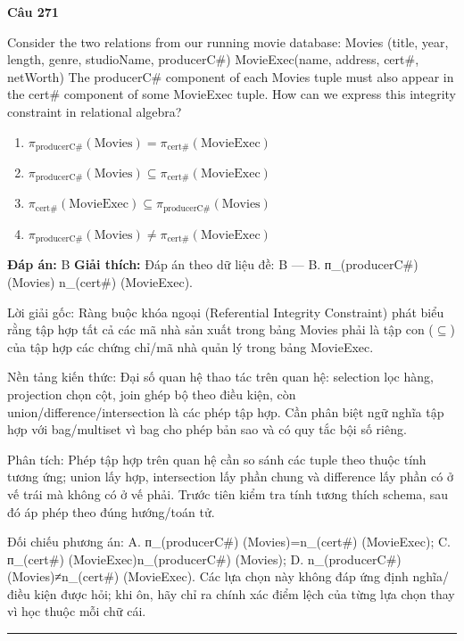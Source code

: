 \documentclass[11pt,a4paper]{article}
\newenvironment{question}[1]{%
  \par\vspace{1em}\noindent\textbf{\large Câu #1}\par\vspace{0.4em}
}{%
  \par\vspace{1em}\hrule\vspace{0.6em}
}
\newenvironment{choices}{%
  \begin{enumerate}[label=\textbf{\Alph*.},leftmargin=2.2em,itemsep=2pt,topsep=3pt]
}{%
  \end{enumerate}
}
\newcommand{\choice}{\item}
\begin{document}
\begin{question}{271}
Consider the two relations from our running movie database: Movies (title, year, length, genre, studioName, producerC#) MovieExec(name, address, cert#, netWorth) The producerC# component of each Movies tuple must also appear in the cert# component of some MovieExec tuple. How can we express this integrity constraint in relational algebra?
\begin{choices}
\choice \(\pi_{\text{producerC#}}(\text{Movies}) = \pi_{\text{cert#}}(\text{MovieExec})\)
\choice \(\pi_{\text{producerC#}}(\text{Movies}) \subseteq \pi_{\text{cert#}}(\text{MovieExec})\)
\choice \(\pi_{\text{cert#}}(\text{MovieExec}) \subseteq \pi_{\text{producerC#}}(\text{Movies})\)
\choice \(\pi_{\text{producerC#}}(\text{Movies}) \neq \pi_{\text{cert#}}(\text{MovieExec})\)
\end{choices}
\textbf{Đáp án:} B
\textbf{Giải thích:} Đáp án theo dữ liệu đề: B — B. п_(producerC#) (Movies) n_(cert#) (MovieExec).

Lời giải gốc: Ràng buộc khóa ngoại (Referential Integrity Constraint) phát biểu rằng tập hợp tất cả các mã nhà sản xuất trong bảng Movies phải là tập con ($\subseteq$) của tập hợp các chứng chỉ/mã nhà quản lý trong bảng MovieExec.

Nền tảng kiến thức: Đại số quan hệ thao tác trên quan hệ: selection lọc hàng, projection chọn cột, join ghép bộ theo điều kiện, còn union/difference/intersection là các phép tập hợp. Cần phân biệt ngữ nghĩa tập hợp với bag/multiset vì bag cho phép bản sao và có quy tắc bội số riêng.

Phân tích: Phép tập hợp trên quan hệ cần so sánh các tuple theo thuộc tính tương ứng; union lấy hợp, intersection lấy phần chung và difference lấy phần có ở vế trái mà không có ở vế phải. Trước tiên kiểm tra tính tương thích schema, sau đó áp phép theo đúng hướng/toán tử.

Đối chiếu phương án: A. п_(producerC#) (Movies)=n_(cert#) (MovieExec); C. п_(cert#) (MovieExec)n_(producerC#) (Movies); D. n_(producerC#) (Movies)≠n_(cert#) (MovieExec). Các lựa chọn này không đáp ứng định nghĩa/điều kiện được hỏi; khi ôn, hãy chỉ ra chính xác điểm lệch của từng lựa chọn thay vì học thuộc mỗi chữ cái.
\end{question}
\end{document}
